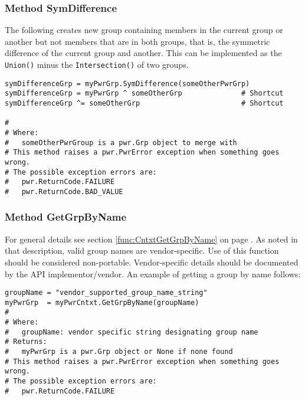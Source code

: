 \documentclass[12pt]{report} %
\begin{document}
\begin{appendices}

\subsubsection{Method SymDifference} \label{meth:SymDifference}

The following creates new group containing members in the current group or
another but not members that are in both groups, that is, the symmetric
difference of the current group and another. This can be implemented as the
\texttt{Union()} minus the \texttt{Intersection()} of two groups.

\begin{center}\begin{minipage}{.95\linewidth}\begin{lstlisting}
symDifferenceGrp = myPwrGrp.SymDifference(someOtherPwrGrp)
symDifferenceGrp = myPwrGrp ^ someOtherGrp              # Shortcut
symDifferenceGrp ^= someOtherGrp                        # Shortcut

#
# Where:
#   someOtherPwrGroup is a pwr.Grp object to merge with
# This method raises a pwr.PwrError exception when something goes wrong.
# The possible exception errors are:
#   pwr.ReturnCode.FAILURE
#   pwr.ReturnCode.BAD_VALUE
\end{lstlisting}\end{minipage}\end{center}

\subsubsection{Method GetGrpByName} \label{meth:GetGrpByName}

For general details see section \ref{func:CntxtGetGrpByName} on page
\pageref{func:CntxtGetGrpByName}. As noted in that description, valid group
names are vendor-specific. Use of this function should be considered
non-portable. Vendor-specific details should be documented by the API
implementor/vendor. An example of getting a group by name follows:

\begin{center}\begin{minipage}{.95\linewidth}\begin{lstlisting}
groupName = "vendor_supported_group_name_string"
myPwrGrp  = myPwrCntxt.GetGrpByName(groupName)
#
# Where:
#   groupName: vendor specific string designating group name
# Returns:
#   myPwrGrp is a pwr.Grp object or None if none found
# This method raises a pwr.PwrError exception when something goes wrong.
# The possible exception errors are:
#   pwr.ReturnCode.FAILURE
\end{lstlisting}\end{minipage}\end{center}


\end{appendices}
\end{document}
